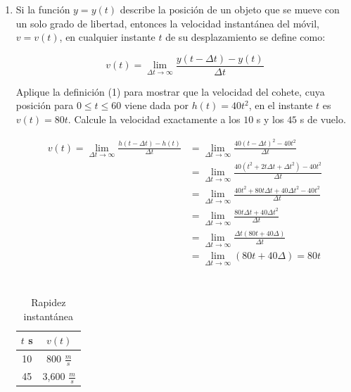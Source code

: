 \documentclass[12pt]{article}
\begin{document}
\begin{enumerate}
    {\bf R:} $120 \frac{m}{s}$, ya que el valor intermedio de la rapidez promedio de los valores $3- \Delta t$ y $\Delta t +3$ es cercano a 120.\par
    
\item Si la función $y = y(t)$ describe la posición de un objeto que se mueve con un solo grado de libertad, entonces la velocidad instantánea del móvil, $v = v(t)$, en cualquier instante $t$ de su desplazamiento se define como:
  
  \begin{equation}
    v(t) = \lim_{\Delta t \rightarrow \infty}\frac{y(t - \Delta t) - y(t)}{\Delta t}
  \end{equation}
  
  Aplique la definición (1) para mostrar que la velocidad del cohete, cuya posición para $0 \leq t \leq 60$ viene dada por $h(t) = 40t^2$, en el instante $t$ es $v(t) = 80t$. Calcule la velocidad exactamente a los $10$ s y los $45$ s de vuelo.
  
    \begin{align*}
        v(t) = \lim_{\Delta t \rightarrow \infty}\frac{h(t - \Delta t) - h(t)}{\Delta t}&= \lim_{\Delta t \rightarrow \infty}\frac{40(t - \Delta t)^2 - 40t^2}{\Delta t}\\
        &=\lim_{\Delta t \rightarrow \infty}\frac{40(t^2+2t\Delta t + \Delta t^2) - 40t^2}{\Delta t}\\
        &=\lim_{\Delta t \rightarrow \infty}\frac{40t^2+80t\Delta t + 40\Delta t^2 - 40t^2}{\Delta t}\\
        &=\lim_{\Delta t \rightarrow \infty}\frac{80t\Delta t + 40\Delta t^2}{\Delta t}\\
        &=\lim_{\Delta t \rightarrow \infty}\frac{\Delta t(80t+ 40\Delta)}{\Delta t}\\
        &=\lim_{\Delta t \rightarrow \infty}(80t+ 40\Delta) = 80t\\
    \end{align*}\\
    
    \begin{table}[h]
  
        \begin{center}
  
            \begin{tabular}{| c | c |}\hline %
                $t$ s & $v(t)$\\ \hline
                10 & 800 $\frac{m}{s}$\\ 
                45& 3,600 $\frac{m}{s}$  \\ \hline
            \end{tabular}
  
            \caption{Rapidez instantánea} 
  
            \label{tab:rapinst}
  
        \end{center}
  
    \end{table}
    
\end{enumerate}
\end{document}
